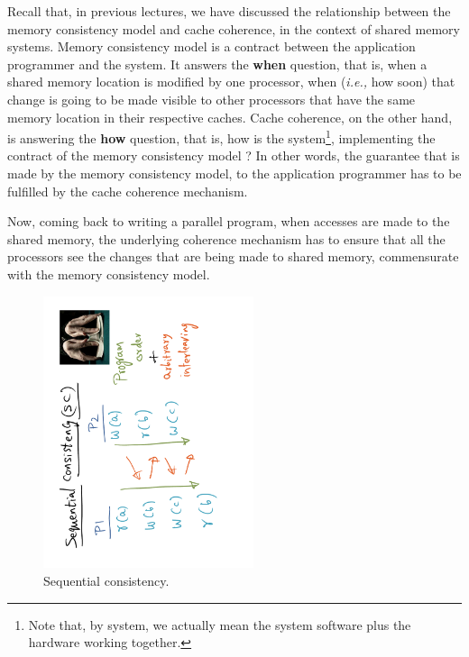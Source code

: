 \documentclass[11pt]{lecture}
\def\fullsize{0.55\textwidth}
\begin{document}
Recall that, in previous lectures, we have discussed the relationship between the 
memory consistency model and cache coherence, in the context of shared memory systems. 
Memory consistency model is a contract between the application programmer and the 
system. It answers the {\bf when} question, that is, when a shared memory location 
is modified by one processor, when ({\it i.e.,} how soon) that change is going to be made 
visible to other processors that have the same memory location in their respective 
caches. Cache coherence, on the other hand, is answering the {\bf how} question, 
that is, how is the system\footnote{Note that, by system, we actually mean the system software plus the hardware working together.}, 
implementing the contract of the memory consistency model ? In other words, the 
guarantee that is made by the memory consistency model, to the application 
programmer has to be fulfilled by the cache coherence mechanism. 

Now, coming back to writing a parallel program, when accesses are made to the shared 
memory, the underlying coherence mechanism has to ensure that all the processors 
see the changes that are being made to shared memory, commensurate with the 
memory consistency model. 

\begin{figure}
\centering
\includegraphics[width=\fullsize,angle=-90]{Figures/sc}
\caption{Sequential consistency.}\label{fig: sc}
\end{figure}
\end{document}
